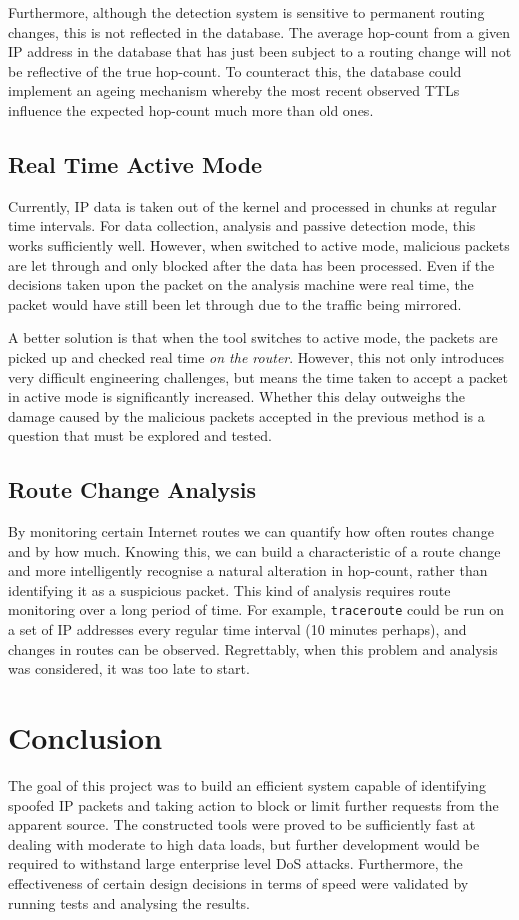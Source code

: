 \documentclass[12pt,twoside]{article}
\begin{document}
Furthermore, although the detection system is sensitive to permanent routing changes, this is not reflected in the database. The average hop-count from a given IP address in the database that has just been subject to a routing change will not be reflective of the true hop-count. To counteract this, the database could implement an ageing mechanism whereby the most recent observed TTLs influence the expected hop-count much more than old ones.

\subsection{Real Time Active Mode}
Currently, IP data is taken out of the kernel and processed in chunks at regular time intervals. For data collection, analysis and passive detection mode, this works sufficiently well. However, when switched to active mode, malicious packets are let through and only blocked after the data has been processed. Even if the decisions taken upon the packet on the analysis machine were real time, the packet would have still been let through due to the traffic being mirrored.

A better solution is that when the tool switches to active mode, the packets are picked up and checked real time \textit{on the router}. However, this not only introduces very difficult engineering challenges, but means the time taken to accept a packet in active mode is significantly increased. Whether this delay outweighs the damage caused by the malicious packets accepted in the previous method is a question that must be explored and tested.

\subsection{Route Change Analysis}
By monitoring certain Internet routes we can quantify how often routes change and by how much. Knowing this, we can build a characteristic of a route change and more intelligently recognise a natural alteration in hop-count, rather than identifying it as a suspicious packet. This kind of analysis requires route monitoring over a long period of time. For example, \texttt{traceroute} could be run on a set of IP addresses every regular time interval (10 minutes perhaps), and changes in routes can be observed. Regrettably, when this problem and analysis was considered, it was too late to start.

\section{Conclusion}
The goal of this project was to build an efficient system capable of identifying spoofed IP packets and taking action to block or limit further requests from the apparent source. The constructed tools were proved to be sufficiently fast at dealing with moderate to high data loads, but further development would be required to withstand large enterprise level DoS attacks. Furthermore, the effectiveness of certain design decisions in terms of speed were validated by running tests and analysing the results.
\end{document}
